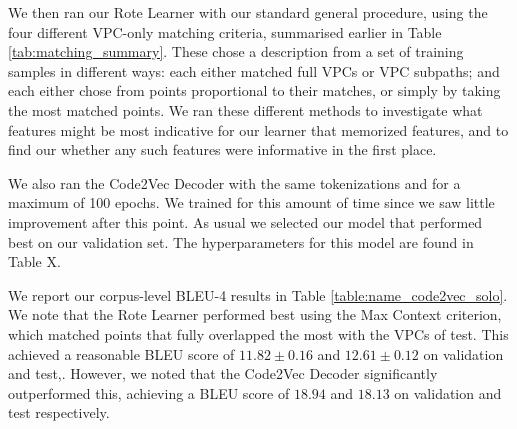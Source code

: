 We then ran our Rote Learner with our standard general procedure, using the four different VPC-only matching criteria, summarised earlier in Table \ref{tab:matching_summary}. These chose a description from a set of training samples in different ways: each either matched full VPCs or VPC subpaths; and each either chose from points proportional to their matches, or simply by taking the most matched points.
We ran these different methods to investigate what features might be most indicative for our learner that memorized features, and to find our whether any such features were informative in the first place.

We also ran the Code2Vec Decoder with the same tokenizations and for a maximum of 100 epochs. 
We trained for this amount of time since we saw little improvement after this point.
As usual we selected our model that performed best on our validation set.
The hyperparameters for this model are found in Table {X}.

We report our corpus-level BLEU-4 results in Table \ref{table:name_code2vec_solo}. We note that the Rote Learner performed best using the Max Context criterion, which matched points that fully overlapped the most with the VPCs of test. This achieved a reasonable BLEU score of $ 11.82 \pm  0.16 $ and  $ 12.61 \pm 0.12 $ on validation and test,. However, we noted that the Code2Vec Decoder significantly outperformed this, achieving a BLEU score of $ 18.94 $ and $ 18.13 $ on validation and test respectively.


